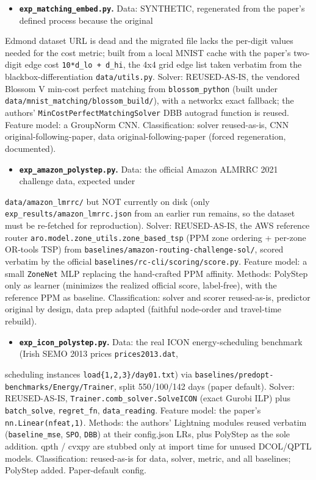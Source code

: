\documentclass[10pt]{article}
\begin{document}
\begin{itemize}\setlength{\itemsep}{2pt}
\item \textbf{\texttt{exp\_matching\_embed.py}.} Data: SYNTHETIC, regenerated from the paper's defined process because the original
\end{itemize}
  Edmond dataset URL is dead and the migrated file lacks the per-digit values needed for the cost metric; built from a
  local MNIST cache with the paper's two-digit edge cost \texttt{10*d\_lo + d\_hi}, the 4x4 grid edge list taken verbatim from
  the blackbox-differentiation \texttt{data/utils.py}. Solver: REUSED-AS-IS, the vendored Blossom V min-cost perfect matching
  from \texttt{blossom\_python} (built under \texttt{data/mnist\_matching/blossom\_build/}), with a networkx exact fallback; the authors'
  \texttt{MinCostPerfectMatchingSolver} DBB autograd function is reused. Feature model: a GroupNorm CNN. Classification: solver
  reused-as-is, CNN original-following-paper, data original-following-paper (forced regeneration, documented).

\begin{itemize}\setlength{\itemsep}{2pt}
\item \textbf{\texttt{exp\_amazon\_polystep.py}.} Data: the official Amazon ALMRRC 2021 challenge data, expected under
\end{itemize}
  \texttt{data/amazon\_lmrrc/} but NOT currently on disk (only \texttt{exp\_results/amazon\_lmrrc.json} from an earlier run remains, so
  the dataset must be re-fetched for reproduction). Solver: REUSED-AS-IS, the AWS reference router
  \texttt{aro.model.zone\_utils.zone\_based\_tsp} (PPM zone ordering + per-zone OR-tools TSP) from
  \texttt{baselines/amazon-routing-challenge-sol/}, scored verbatim by the official \texttt{baselines/rc-cli/scoring/score.py}.
  Feature model: a small \texttt{ZoneNet} MLP replacing the hand-crafted PPM affinity. Methods: PolyStep only as learner
  (minimizes the realized official score, label-free), with the reference PPM as baseline. Classification: solver and
  scorer reused-as-is, predictor original by design, data prep adapted (faithful node-order and travel-time rebuild).

\begin{itemize}\setlength{\itemsep}{2pt}
\item \textbf{\texttt{exp\_icon\_polystep.py}.} Data: the real ICON energy-scheduling benchmark (Irish SEMO 2013 prices \texttt{prices2013.dat},
\end{itemize}
  scheduling instances \texttt{load\{1,2,3\}/day01.txt}) via \texttt{baselines/predopt-benchmarks/Energy/Trainer}, split 550/100/142
  days (paper default). Solver: REUSED-AS-IS, \texttt{Trainer.comb\_solver.SolveICON} (exact Gurobi ILP) plus \texttt{batch\_solve},
  \texttt{regret\_fn}, \texttt{data\_reading}. Feature model: the paper's \texttt{nn.Linear(nfeat,1)}. Methods: the authors' Lightning modules
  reused verbatim (\texttt{baseline\_mse}, \texttt{SPO}, \texttt{DBB}) at their config.json LRs, plus PolyStep as the sole addition. qpth /
  cvxpy are stubbed only at import time for unused DCOL/QPTL models. Classification: reused-as-is for data, solver,
  metric, and all baselines; PolyStep added. Paper-default config.
\end{document}
